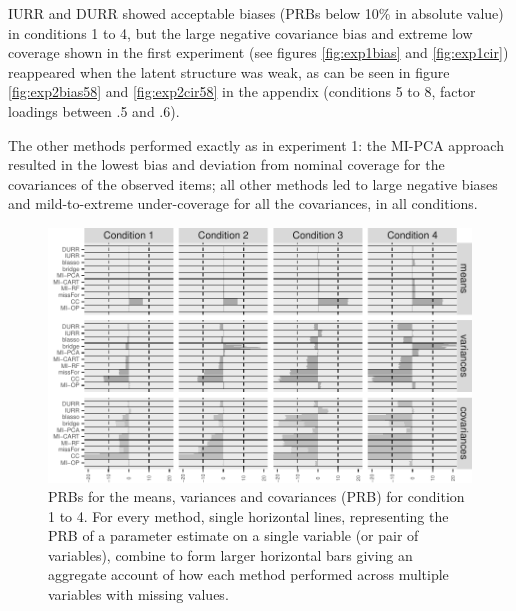 	IURR and DURR showed acceptable biases (PRBs below 10\% in absolute value) in conditions 1 to 4, but the 
	large negative covariance bias and extreme low coverage shown in the first experiment (see
	figures \ref{fig:exp1bias} and \ref{fig:exp1cir}) reappeared when the latent structure was weak, as can be seen in 
	figure \ref{fig:exp2bias58} and \ref{fig:exp2cir58} in the appendix (conditions 5 to 8, factor loadings 
	between .5 and .6).

	The other methods performed exactly as in experiment 1: the MI-PCA approach resulted in the lowest 
	bias and deviation from nominal coverage for the covariances of the observed items; 
	all other methods led to large negative biases and mild-to-extreme under-coverage for all the covariances, 
	in all conditions.

\begin{figure}
	\includegraphics{../../output/graphs/exp2_semR_bias_14.pdf}
\caption{PRBs for the means, variances and covariances (PRB) for condition 1 to 4.
	For every method, single horizontal lines, representing the PRB of a parameter estimate on 
	a single variable (or pair of variables), combine to form larger horizontal bars giving an 
	aggregate account of how each method performed across multiple variables with missing values.
}
\label{fig:exp2bias}
\end{figure}

